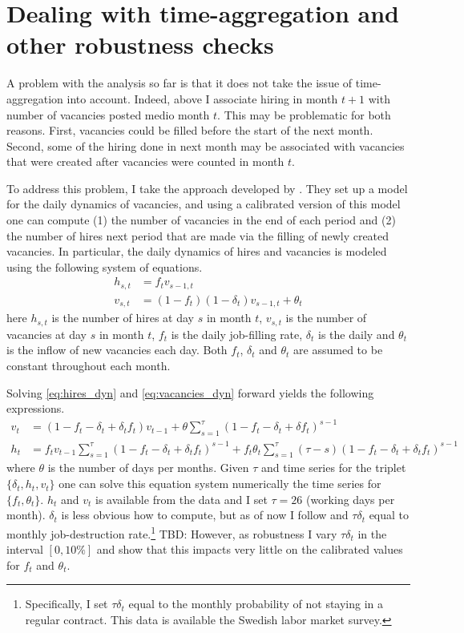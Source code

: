 \section{Dealing with time-aggregation and other robustness checks}
\label{sec:time_agg}

A problem with the analysis so far is that it does not take the issue of time-aggregation into account. Indeed, above I associate hiring in month $t+1$ with number of vacancies posted medio month $t$. This may be problematic for both reasons. First, vacancies could be filled before the start of the next month. Second, some of the hiring done in next month may be associated with vacancies that were created after vacancies were counted in month $t$.

To address this problem, I take the approach developed by \cite{Davis2013}. They set up a model for the daily dynamics of vacancies, and using a calibrated version of this model one can compute (1) the number of vacancies in the end of each period and (2) the number of hires next period that are made via the filling of newly created vacancies. In particular, the daily dynamics of hires and vacancies is modeled using the following system of equations.
\begin{align}
h_{s,t}&=f_t v_{s-1,t} \label{eq:hires_dyn} \\
v_{s,t}&=(1-f_t)(1-\delta_t)v_{s-1,t} + \theta_t \label{eq:vacancies_dyn} 
\end{align}
here $h_{s,t}$ is the number of hires at day $s$ in month $t$, $v_{s,t}$ is the number of vacancies at day $s$ in month $t$, $f_t$ is the daily job-filling rate, $\delta_t$ is the daily and $\theta_t$ is the inflow of new vacancies each day. Both $f_t$, $\delta_t$ and $\theta_t$ are assumed to be constant throughout each month. 

Solving \ref{eq:hires_dyn} and \ref{eq:vacancies_dyn} forward yields the following expressions.
\begin{align}
v_t&=\left( 1-f_t-\delta_t+\delta_t f_t \right) v_{t-1} + \theta \sum_{s=1}^{\tau} \left( 1-f_t-\delta_t+\delta f_t \right)^{s-1} \\
h_t&=f_t v_{t-1} \sum_{s=1}^{\tau} \left( 1-f_t-\delta_t+\delta_t f_t \right)^{s-1} + f_t \theta_t \sum_{s=1}^{\tau} \left( \tau- s\right) \left( 1-f_t-\delta_t+\delta_t f_t \right)^{s-1}
\end{align}
where $\theta$ is the number of days per months. Given $\tau$ and time series for the triplet $\{\delta_t, h_t, v_t \}$ one can solve this equation system numerically the time series for $\{ f_t, \theta_t \}$. $h_t$ and $v_t$ is available from the data and I set $\tau=26$ (working days per month). $\delta_t$ is less obvious how to compute, but as of now I follow \cite{Davis2013} and $\tau \delta_t$ equal to monthly job-destruction rate.\footnote{Specifically, I set $\tau \delta_t$ equal to the monthly probability of not staying in a regular contract. This data is available the Swedish labor market survey.} TBD: However, as robustness I vary $\tau \delta_t$ in the interval $[0,10\%]$ and show that this impacts very little on the calibrated values for $f_t$ and $\theta_t$.

